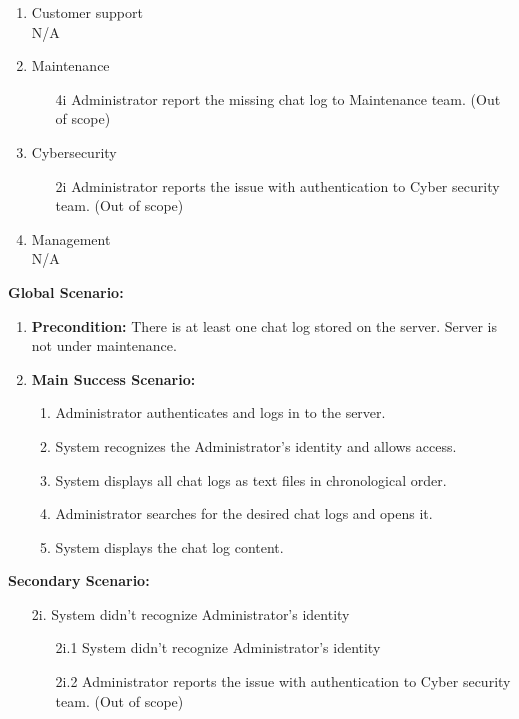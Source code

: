 \documentclass[]{article}
\begin{document}
\begin{enumerate}[{\bf BE1.}]
\begin{enumerate}[{\bf BE8.}]
\begin{enumerate}[{\bf VP1.}]
            \item Customer support \\
	            N/A
            \item Maintenance \\
	            \begin{enumerate}
                        \item[4i] Administrator report the missing chat log to Maintenance team. (Out of scope)
                    \end{enumerate}
            \item Cybersecurity \\
            	\begin{enumerate}
                        \item[2i] Administrator reports the issue with authentication to Cyber security team. (Out of scope)
                \end{enumerate}
            \item Management \\
            N/A \\
		\end{enumerate}
		{\bf Global Scenario:}\\
        \begin{enumerate}[{  }]
            \item \textbf{Precondition:} There is at least one chat log stored on the server. Server is not under maintenance.
            \item \textbf{Main Success Scenario:}
            \begin{enumerate}[{  1.}]
                    \item Administrator authenticates and logs in to the server. 
		    \item System recognizes the Administrator’s identity and allows access.  
                    \item System displays all chat logs as text files in chronological order. 
                    \item Administrator searches for the desired chat logs and opens it. 
                    \item System displays the chat log content.  
            \end{enumerate}
        \end{enumerate}
	        \textbf{Secondary Scenario:}
                \begin{enumerate}
		
                    \item[2i.] System didn’t recognize Administrator’s identity 
                    \begin{enumerate}
                        \item[2i.1] System didn’t recognize Administrator’s identity
                        \item[2i.2] Administrator reports the issue with authentication to Cyber security team. (Out of scope)
                    \end{enumerate}
		    

\end{enumerate}
\end{enumerate}
\end{enumerate}
\end{document}
